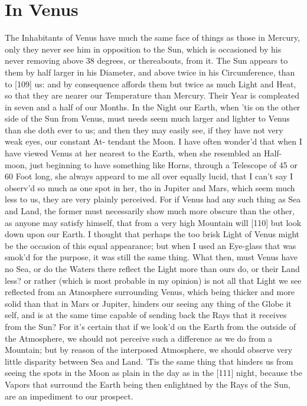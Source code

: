 \documentclass[letterpaper]{book}
\begin{document}
\section{In Venus}

The Inhabitants of Venus have much the same face of things as those in
Mercury, only they never see him in opposition to the Sun, which is
occasioned by his never removing above 38 degrees, or thereabouts, from it.
The Sun appears to them by half larger in his Diameter, and above twice in
his Circumference, than to [109] us: and by consequence affords them but
twice as much Light and Heat, so that they are nearer our Temperature than
Mercury. Their Year is compleated in seven and a half of our Months. In
the Night our Earth, when 'tis on the other side of the Sun from Venus, must
needs seem much larger and lighter to Venus than she doth ever to us; and
then they may easily see, if they have not very weak eyes, our constant At-
tendant the Moon. I have often wonder'd that when I have viewed Venus at her
nearest to the Earth, when she resembled an Half-moon, just beginning to
have something like Horns, through a Telescope of 45 or 60 Foot long, she
always appeard to me all over equally lucid, that I can't say I observ'd so
much as one spot in her, tho in Jupiter and Mars, which seem much less to
us, they are very plainly perceived. For if Venus had any such thing as Sea
and Land, the former must necessarily show much more obscure than the other,
as anyone may satisfy himself, that from a very high Mountain will [110] but
look down upon our Earth. I thought that perhaps the too brisk Light of
Venus might be the occasion of this equal appearance; but when I used an
Eye-glass that was smok'd for the purpose, it was still the same thing. What
then, must Venus have no Sea, or do the Waters there reflect the Light more
than ours do, or their Land less? or rather (which is most probable in my
opinion) is not all that Light we see reflected from an Atmosphere
surrounding Venus, which being thicker and more solid than that in Mars or
Jupiter, hinders our seeing any thing of the Globe it self, and is at the
same time capable of sending back the Rays that it receives from the Sun?
For it's certain that if we look'd on the Earth from the outside of the
Atmosphere, we should not perceive such a difference as we do from a
Mountain; but by reason of the interposed Atmosphere, we should observe very
little disparity between Sea and Land. 'Tis the same thing that hinders us
from seeing the spots in the Moon as plain in the day as in the [111] night,
because tbe Vapors that surround the Earth being then enlightned by the Rays
of the Sun, are an impediment to our prospect.
\end{document}
